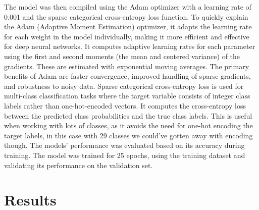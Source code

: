 \documentclass[12pt]{article}
\begin{document}
The model was then compiled using the Adam optimizer with a learning rate of 0.001 and the sparse categorical cross-entropy loss function.
To quickly explain the Adam (Adaptive Moment Estimation) optimizer, it adapts the learning rate for each weight in the model individually, making 
it more efficient and effective for deep neural networks. It computes adaptive learning rates for each parameter using the first and second moments (the mean and centered variance) of the gradients.
These are estimated with exponential moving averages. The primary benefits of Adam are faster convergence, improved handling of sparse gradients, and 
robustness to noisy data. Sparse categorical cross-entropy loss is used for multi-class classification tasks where the target variable consists of 
integer class labels rather than one-hot-encoded vectors. It computes the cross-entropy loss between the predicted class probabilities and the true class labels.
This is useful when working with lots of classes, as it avoids the need for one-hot encoding the target labels, in this case with 29 classes we could've gotten away with encoding though.
The models' performance was evaluated based on its accuracy during training. The model was trained for 25 epochs, using the training dataset and validating its performance on the validation set.

\section{Results}
\end{document}
